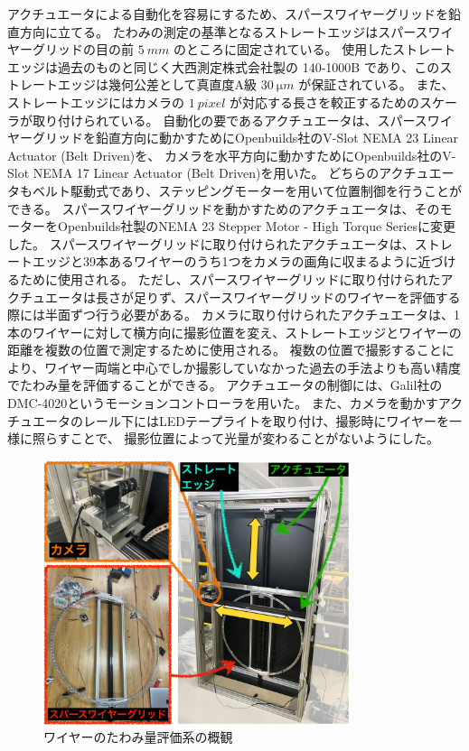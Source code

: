\documentclass[../../main.tex]{subfiles}
\begin{document}
アクチュエータによる自動化を容易にするため、スパースワイヤーグリッドを鉛直方向に立てる。
たわみの測定の基準となるストレートエッジはスパースワイヤーグリッドの目の前 $\SI{5}{mm}$ のところに固定されている。
使用したストレートエッジは過去のものと同じく大西測定株式会社製の 140-1000B であり、このストレートエッジは幾何公差として真直度A級 $\SI{30}{\micro m}$ が保証されている。
また、ストレートエッジにはカメラの $\SI{1}{pixel}$ が対応する長さを較正するためのスケーラが取り付けられている。
自動化の要であるアクチュエータは、スパースワイヤーグリッドを鉛直方向に動かすためにOpenbuilds社のV-Slot NEMA 23 Linear Actuator (Belt Driven)を、
カメラを水平方向に動かすためにOpenbuilds社のV-Slot NEMA 17 Linear Actuator (Belt Driven)を用いた。
どちらのアクチュエータもベルト駆動式であり、ステッピングモーターを用いて位置制御を行うことができる。
スパースワイヤーグリッドを動かすためのアクチュエータは、そのモーターをOpenbuilds社製のNEMA 23 Stepper Motor - High Torque Seriesに変更した。
スパースワイヤーグリッドに取り付けられたアクチュエータは、ストレートエッジと39本あるワイヤーのうち1つをカメラの画角に収まるように近づけるために使用される。
ただし、スパースワイヤーグリッドに取り付けられたアクチュエータは長さが足りず、スパースワイヤーグリッドのワイヤーを評価する際には半面ずつ行う必要がある。
カメラに取り付けられたアクチュエータは、1本のワイヤーに対して横方向に撮影位置を変え、ストレートエッジとワイヤーの距離を複数の位置で測定するために使用される。
複数の位置で撮影することにより、ワイヤー両端と中心でしか撮影していなかった過去の手法よりも高い精度でたわみ量を評価することができる。
アクチュエータの制御には、Galil社のDMC-4020というモーションコントローラを用いた。
また、カメラを動かすアクチュエータのレール下にはLEDテープライトを取り付け、撮影時にワイヤーを一様に照らすことで、
撮影位置によって光量が変わることがないようにした。
\begin{figure}[H]
    \centering
    \includegraphics[width=0.8\textwidth]{wiresag/wiresag_system.pdf}
    \caption{ワイヤーのたわみ量評価系の概観}
    \label{fig:wiresag_system}
\end{figure}
\end{document}
